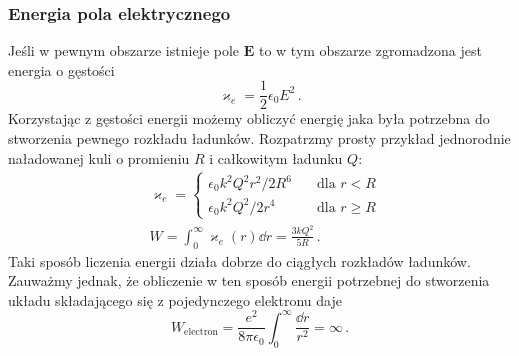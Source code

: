 \documentclass[../main.tex]{subfiles}
\begin{document}
\subsubsection{Energia pola elektrycznego}
Jeśli w pewnym obszarze istnieje pole \(\mathbf{E}\) to w tym obszarze zgromadzona jest energia o
gęstości
\begin{equation*}
    \varkappa_e=\frac{1}{2}\epsilon_0E^2\,.
\end{equation*}
Korzystając z gęstości energii możemy obliczyć energię jaka była potrzebna do stworzenia pewnego
rozkładu ładunków. Rozpatrzmy prosty przykład jednorodnie naładowanej kuli o promieniu \(R\) i
całkowitym ładunku \(Q\):
\begin{equation*}
    \begin{split}
        &\varkappa_e=\begin{cases} \epsilon_0k^2Q^2r^2/2R^6\quad&\text{dla \(r<R\)}\\ \epsilon_0 k^2Q^2/2r^4\quad&\text{dla \(r\geq R\)}\end{cases}\\
        &W=\int_0^\infty\varkappa_e(r)\dd{r}=\frac{3kQ^2}{5R}\,.
    \end{split}
\end{equation*}
Taki sposób liczenia energii działa dobrze do ciągłych rozkładów ładunków. Zauważmy jednak, że
obliczenie w ten sposób energii potrzebnej do stworzenia układu składającego się z pojedynczego
elektronu daje
\begin{equation*}
    W_\text{electron}=\frac{e^2}{8\pi\epsilon_0}\int_0^\infty\frac{\dd{r}}{r^2}=\infty\,.
\end{equation*}
\end{document}
